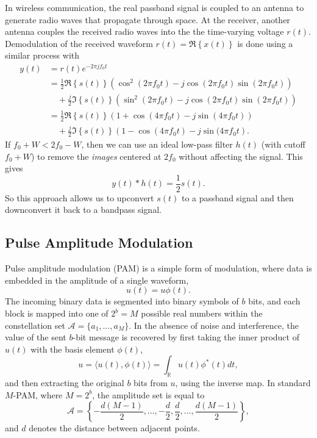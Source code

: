 In wireless communication, the real passband signal is coupled to an antenna to generate radio waves that propagate through space.
At the receiver, another antenna couples the received radio waves into the the time-varying voltage $r(t)$.
Demodulation of the received waveform $r(t) = \Re \left\{ x(t) \right \}$ is done using a similar process with
\begin{align*}
y(t)
& = r(t) e^{-2\pi j f_0 t} \\
& =  \frac{1}{2} \Re \left\{ s(t) \right\} \left( \cos^2 (2 \pi f_0 t) - j \cos(2\pi f_0 t) \sin(2\pi f_0 t) \right) \\
& \quad + \frac{j}{2} \Im \left\{ s(t) \right\} \left( \sin^2 (2 \pi f_0 t) - j \cos(2\pi f_0 t) \sin(2\pi f_0 t) \right) \\
& =  \frac{1}{2} \Re \left\{ s(t) \right\} \left( 1 + \cos(4\pi f_0 t) - j \sin(4\pi f_0 t) \right) \\
& \quad + \frac{j}{2} \Im \left\{ s(t) \right\} \left( 1 - \cos(4 \pi f_0 t) - j \sin(4 \pi f_0 t \right).
\end{align*}
If $f_0 + W < 2 f_0 - W$, then we can use an ideal low-pass filter $h(t)$ (with cutoff $f_0+W$) to remove the \emph{images} centered at $2f_0$ without affecting the signal.
This gives
\[ y(t) * h(t) = \frac{1}{2} s(t). \]
So this approach allows us to upconvert $s(t)$ to a passband signal and then downconvert it back to a bandpass signal.

\iffalse
\subsection{Pulse Amplitude Modulation}

Pulse amplitude modulation (PAM) is a simple form of modulation, where data is embedded in the amplitude of a single waveform,
\begin{equation*}
u(t) = u \phi (t) .
\end{equation*}
The incoming binary data is segmented into binary symbols of $b$ bits, and each block is mapped into one of $2^b = M$ possible real numbers within the constellation set $\mathcal{A} = \{ a_1, \ldots, a_M \}$.
In the absence of noise and interference, the value of the sent $b$-bit message is recovered by first taking the inner product of $u(t)$ with the basis element $\phi (t)$,
\begin{equation*}
u = \langle u(t), \phi(t) \rangle = \int_{\mathbb{R}} u(t) \phi^*(t) dt ,
\end{equation*}
and then extracting the original $b$ bits from $u$, using the inverse map.
In standard $M$-PAM, where $M = 2^b$, the amplitude set is equal to
\begin{equation*}
\mathcal{A} = \left\{ - \frac{d(M-1)}{2} , \ldots, - \frac{d}{2}, \frac{d}{2}, \ldots, \frac{d(M-1)}{2} \right\} ,
\end{equation*}
and $d$ denotes the distance between adjacent points.


